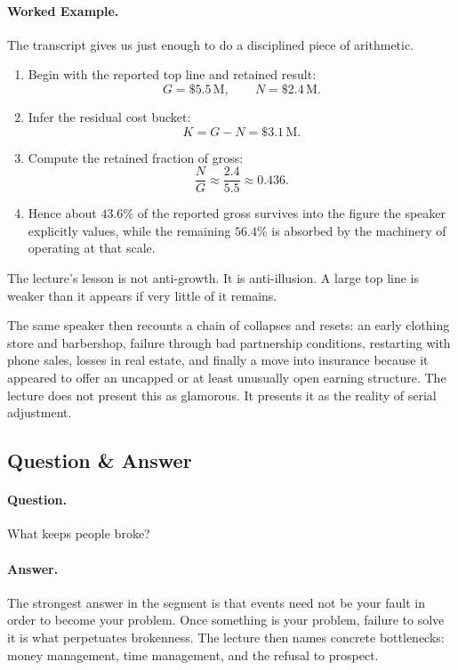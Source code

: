 \paragraph{Worked Example.}
The transcript gives us just enough to do a disciplined piece of arithmetic.
\begin{enumerate}
\item Begin with the reported top line and retained result:
\[
G=\text{\$}5.5\,\mathrm{M},
\qquad
N=\text{\$}2.4\,\mathrm{M}.
\]
\item Infer the residual cost bucket:
\[
K = G-N = \text{\$}3.1\,\mathrm{M}.
\]
\item Compute the retained fraction of gross:
\[
\frac{N}{G} \approx \frac{2.4}{5.5} \approx 0.436.
\]
\item Hence about \(43.6\%\) of the reported gross survives into the figure the speaker explicitly values, while the remaining \(56.4\%\) is absorbed by the machinery of operating at that scale.
\end{enumerate}
The lecture's lesson is not anti-growth. It is anti-illusion. A large top line is weaker than it appears if very little of it remains.

The same speaker then recounts a chain of collapses and resets: an early clothing store and barbershop, failure through bad partnership conditions, restarting with phone sales, losses in real estate, and finally a move into insurance because it appeared to offer an uncapped or at least unusually open earning structure. The lecture does not present this as glamorous. It presents it as the reality of serial adjustment.

\subsection{Question \& Answer}

\paragraph{Question.} What keeps people broke?

\paragraph{Answer.} The strongest answer in the segment is that events need not be your fault in order to become your problem. Once something is your problem, failure to solve it is what perpetuates brokenness. The lecture then names concrete bottlenecks: money management, time management, and the refusal to prospect.

